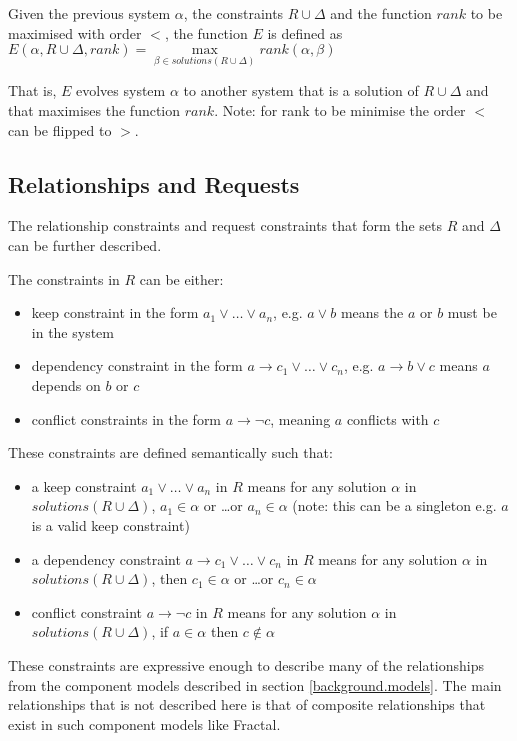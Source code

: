 \begin{defs}
Given the previous system $\alpha$, the constraints $R \cup \Delta$ and the function $rank$ to be maximised with order $<$, the function $E$ is defined as
$E(\alpha, R \cup \Delta,rank) = \max \limits_{\beta \in solutions(R \cup \Delta)} rank(\alpha,\beta)$
\end{defs}

That is, $E$ evolves system $\alpha$ to another system that is a solution of $R \cup \Delta$ and that maximises the function $rank$.
Note: for rank to be minimise the order $<$ can be flipped to $>$.

\subsection{Relationships and Requests}
The relationship constraints and request constraints that form the sets $R$ and $\Delta$ can be further described. 

The constraints in $R$ can be either: 
\begin{itemize}
  \item keep constraint in the form $a_1 \vee \ldots \vee a_n$, e.g. $a \vee b$ means the $a$ or $b$ must be in the system
  \item dependency constraint in the form $a \rightarrow c_1 \vee \ldots \vee c_n$, e.g. $a \rightarrow b \vee c$ means $a$ depends on $b$ or $c$
  \item conflict constraints in the form $a \rightarrow \neg c$, meaning $a$ conflicts with $c$
\end{itemize}

These constraints are defined semantically such that:
\begin{itemize}
	\item a keep constraint  $a_1 \vee \ldots \vee a_n$ in $R$ means for any solution $\alpha$ in $solutions(R \cup \Delta)$, $a_1 \in \alpha$ or \ldots or $a_n \in \alpha$ 
	(note: this can be a singleton e.g. $a$ is a valid keep constraint)
	\item a dependency constraint $a \rightarrow c_1 \vee \ldots \vee c_n$ in $R$ means for any solution $\alpha$ in $solutions(R \cup \Delta)$, then $c_1 \in \alpha$ or \ldots or $c_n \in \alpha$
	\item conflict constraint $a \rightarrow \neg c$ in $R$ means for any solution $\alpha$ in $solutions(R \cup \Delta)$, if $a \in \alpha$ then $c \not \in\alpha$
\end{itemize}
These constraints are expressive enough to describe many of the relationships from the component models described in section \ref{background.models}.
The main relationships that is not described here is that of composite relationships that exist in such component models like Fractal.

